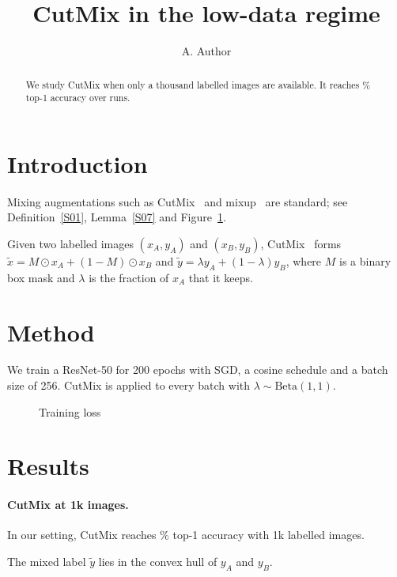 \documentclass[11pt]{article}
\title{CutMix in the low-data regime}
\author{A. Author}
\date{}
\begin{document}
\maketitle

\begin{abstract}
We study CutMix when only a thousand labelled images are available. It reaches \% top-1
accuracy over  runs.
\end{abstract}

\section{Introduction}


Mixing augmentations such as CutMix~\cite{R07} and mixup~\cite{zhang2018mixup} are standard; see
Definition~\ref{S01}, Lemma~\ref{S07} and Figure~\ref{S03}.

\begin{definition}[CutMix]\label{S01}
Given two labelled images $(x_A, y_A)$ and $(x_B, y_B)$, CutMix~\cite{R07} forms
$\tilde{x} = M \odot x_A + (1 - M) \odot x_B$ and $\tilde{y} = \lambda y_A + (1 - \lambda) y_B$,
where $M$ is a binary box mask and $\lambda$ is the fraction of $x_A$ that it keeps.
\end{definition}

\section{Method}

We train a ResNet-50 for 200 epochs with SGD, a cosine schedule and a batch size of 256. CutMix is
applied to every batch with $\lambda \sim \mathrm{Beta}(1, 1)$.

\begin{figure}[t]
  \centering
  \caption{Training loss}\label{S03}
\end{figure}

\section{Results}

\paragraph{CutMix at 1k images.}
In our setting, CutMix reaches \% top-1 accuracy with 1k labelled images. %

\begin{lemma}\label{S07}
The mixed label $\tilde{y}$ lies in the convex hull of $y_A$ and $y_B$.
\end{lemma}



\end{document}
